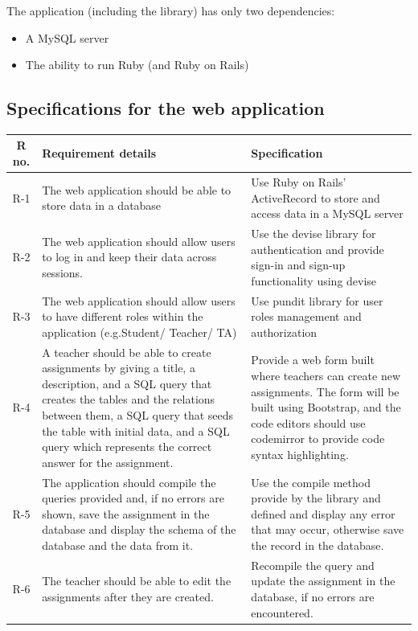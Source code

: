 The application (including the library) has only two dependencies:
\begin{itemize}
  \item A MySQL server
  \item The ability to run Ruby (and Ruby on Rails)
\end{itemize}

\subsection{Specifications for the web application}

\begin{tabularx}{\textwidth}{|c|Y|Y|}
  \hline
  \textbf{R no.} & \textbf{Requirement details} & \textbf{Specification} \\\hline
  \endhead
  R-1 & The web application should be able to store data in a database & Use Ruby on Rails' ActiveRecord to store and access data in a MySQL server \\\hline
  R-2 & The web application should allow users to log in and keep their data across sessions. & Use the devise library for authentication and provide sign-in and sign-up functionality using devise\\\hline
  R-3 &  The web application should allow users to have different roles within the application (e.g.Student/ Teacher/ TA) & Use pundit library for user roles management and authorization\\\hline
  R-4 &  A teacher should be able to create assignments by giving a title, a description, and a SQL query that creates the tables and the relations between them, a SQL query that seeds the table with initial data, and a SQL query which represents the correct answer for the assignment. & Provide a web form built where teachers can create new assignments. The form will be built using Bootstrap, and the code editors should use codemirror to provide code syntax highlighting. \\\hline
  R-5 &  The application should compile the queries provided and, if no errors are shown, save the assignment in the database and display the schema of the database and the data from it. & Use the compile method provide by the library and defined and display any error that may occur, otherwise save the record in the database. \\\hline
  R-6 & The teacher should be able to edit the assignments after they are created. & Recompile the query and update the assignment in the database, if no errors are encountered. \\\hline

\end{tabularx}
